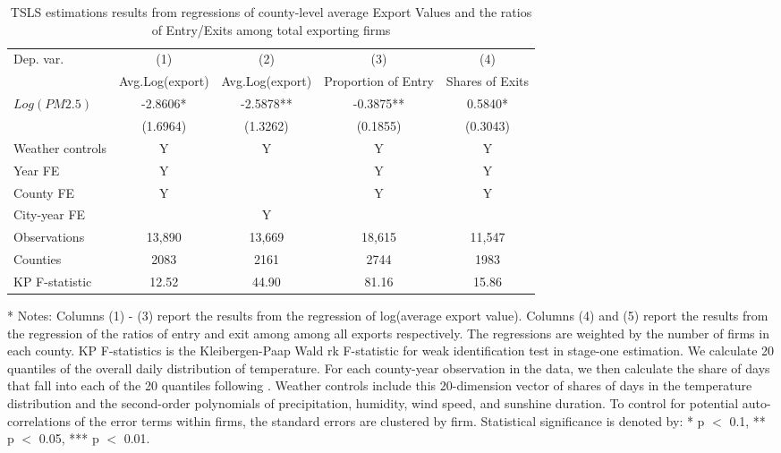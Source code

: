 \documentclass[12pt]{article}
\begin{document}
  \begin{table}[H]\centering
    \caption{TSLS estimations results from regressions of county-level average Export Values and the ratios of Entry/Exits among total exporting firms} \label{tab:by_county}
    \begin{tabular}{l*{4}{c}}
      \hline\hline
      Dep. var.   &\multicolumn{1}{c}{(1)}&\multicolumn{1}{c}{(2)}&\multicolumn{1}{c}{(3)}&\multicolumn{1}{c}{(4)}\\
                  &\multicolumn{1}{c}{Avg.Log(export)}&\multicolumn{1}{c}{Avg.Log(export)}&\multicolumn{1}{c}{Proportion of
                  Entry}&\multicolumn{1}{c}{Shares of Exits}\\
    \hline           
     $Log(PM2.5)$	&-2.8606*	&-2.5878**&-0.3875**&0.5840* \\
                &(1.6964)	&(1.3262)	&(0.1855)	&(0.3043) \\
                Weather controls	&Y &Y &	Y	&Y \\
                Year FE	   &Y	&&	Y&	Y \\
                County FE	 &Y	&		&Y &Y\\
                City-year FE	&&Y&&\\		
      \hline
      Observations	&13,890	& 13,669	&18,615	&11,547 \\
       Counties 	  &2083	&   2161	& 2744	 & 1983 \\
      KP F-statistic	&12.52	&44.90	&81.16	& 15.86 \\
      \hline\hline
  \end{tabular}
  \begin{tablenotes}
    \item[*] \small Notes: Columns (1) - (3) report the results from the regression of log(average export value). Columns (4) and (5) report the results from the regression of the ratios of entry and exit among among all exports respectively. The regressions are weighted by the number of firms in each county. KP F-statistics is the Kleibergen-Paap Wald rk F-statistic for weak identification test in stage-one estimation. We calculate 20 quantiles of the overall daily distribution of temperature. For each county-year observation in the data, we then calculate the share of days that fall into each of the 20 quantiles following \citep{deschenes2017defensive}. Weather controls include this 20-dimension vector of shares of days in the temperature distribution and the second-order polynomials of precipitation, humidity, wind speed, and sunshine duration. To control for potential auto-correlations of the error terms within firms, the standard errors are clustered by firm. Statistical significance is denoted by: * p $<$ 0.1, ** p $<$ 0.05, *** p $<$ 0.01.
  \end{tablenotes}
\end{table}
\end{document}

